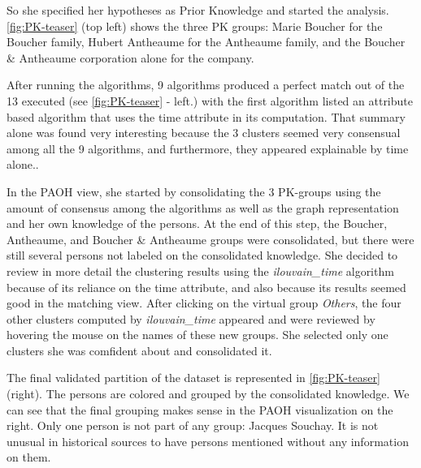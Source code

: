 So she specified her hypotheses as Prior Knowledge and started the analysis. \autoref{fig:PK-teaser} (top left) shows the three PK groups: Marie Boucher for the Boucher family, Hubert Antheaume for the Antheaume family, and the Boucher \& Antheaume corporation alone for the company.

After running the algorithms, 9 algorithms produced a perfect match out of the 13 executed (see \autoref{fig:PK-teaser} - left.) with the first algorithm listed an attribute based algorithm that uses the time attribute in its computation. That summary alone was found very interesting because the 3 clusters seemed very consensual among all the 9 algorithms, and furthermore, they appeared explainable by time alone..

In the PAOH view, she started by consolidating the 3 PK-groups using the amount of consensus among the algorithms as well as the graph representation and her own knowledge of the persons. At the end of this step, the Boucher, Antheaume, and Boucher \& Antheaume groups were consolidated, but there were still several persons not labeled on the consolidated knowledge. She decided to review in more detail the clustering results using the \emph{ilouvain\_time} algorithm because of its reliance on the time attribute, and also because its results seemed good in the matching view. After clicking on the virtual group \emph{Others}, the four other clusters computed by \emph{ilouvain\_time} appeared and were reviewed  by hovering the mouse on the names of these new groups. She selected only one clusters she was comfident about and consolidated it.

The final validated partition of the dataset is represented in \autoref{fig:PK-teaser} (right).
The persons are colored and grouped by the consolidated knowledge. We can see that the final grouping makes sense in the PAOH visualization on the right. Only one person is not part of any group: Jacques Souchay. It is not unusual in historical sources to have persons mentioned without any information on them. %

